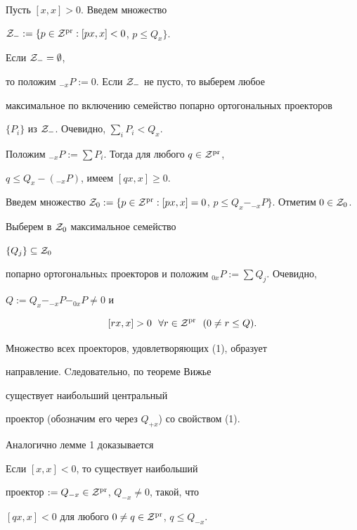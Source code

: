 \begin{pf}


Пусть $[x,x]>0$. Введем множество 


${\cal Z}_{-}:=\{p\in {\cal Z}^{\operatorname{pr}}:[px,x]<0$, $p\leq Q_{x}\}$. 


Если ${\cal Z}_{-}=\emptyset$,


то положим $_{-x}P:=0$. Если ${\cal Z}_{-}$ не пусто, то выберем любое 


максимальное по включению семейство попарно ортогональных проекторов 


$\{P_{i}\}$ из ${\cal Z}_{-}$. Очевидно, $\sum\limits_{i}P_{i}<Q_{x}$. 


Положим $_{-x}P:=\sum P_{i}$. Тогда для любого $q\in {\cal Z}^{\operatorname{pr}}$,


$q\leq Q_{x}-(_{-x}P)$, имеем $[qx,x]\geq 0$.





Введем множество ${\cal Z}_{0}:=\{p\in {\cal Z}^{\pr}: 


[px,x]=0$, $p\leq Q_{x}-_{-x}P\}$. Отметим $0\in {\cal Z}_{0}$.


Выберем в ${\cal Z}_{0}$ максимальное семейство 


$\{Q_{j}\}\subseteq {\cal Z}_{0}$ 


попарно ортогональныx проекторов и положим $_{0x}P:=\sum Q_{j}$. Очевидно, 


$Q:=Q_{x}-_{-x}P-_{0x}P\ne0$ и


\begin{equation}


[rx,x]>0 \ \ \forall r\in {\cal Z}^{\pr} \ \ (0\ne r\leq Q).


\end{equation}


Множество всех проекторов, удовлетворяющих (1), образует


направление. Cледовательно, по теореме Вижье 


существует наибольший центральный


проектор (обозначим его через $Q_{+x}$) со свойством (1).


\end{pf}





Аналогично лемме 1 доказывается





\begin{lem}


Если $[x,x]<0$, то существует наибольший 


проектор $:=Q_{-x}\in {\cal Z}^{\operatorname{pr}}$, $Q_{-x}\ne0$, такой, что


$[qx,x]<0$ для любого $0\ne q\in {\cal Z}^{\operatorname{pr}}$, $q\leq Q_{-x}$.


\end{lem}





